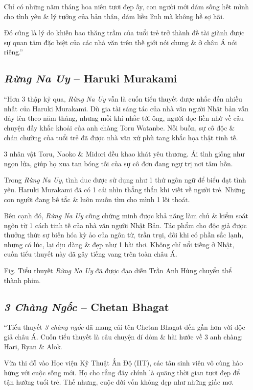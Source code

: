 \documentclass[oneside]{book}
\numberwithin{equation}{section}
\begin{document}
Chỉ có những năm tháng hoa niên tươi đẹp ấy, con người mới dám sống hết mình cho tình yêu \& lý tưởng của bản thân, dám liều lĩnh mà không hề sợ hãi.

Đó cũng là lý do khiến bao thăng trầm của tuổi trẻ trở thành đề tài giành được sự quan tâm đặc biệt của các nhà văn trên thế giới nói chung \& ở châu Á nói riêng.''

\subsection{\textit{Rừng Na Uy} -- Haruki Murakami}
``Hơn 3 thập kỷ qua, \textit{Rừng Na Uy} vẫn là cuốn tiểu thuyết được nhắc đến nhiều nhất của Haruki Murakami. Dù gia tài sáng tác của nhà văn người Nhật bản vẫn dày lên theo năm tháng, nhưng mỗi khi nhắc tới ông, người đọc liền nhớ về câu chuyện đầy khắc khoải của anh chàng Toru Watanbe. Nỗi buồn, sự cô độc \& chán chường của tuổi trẻ đã được nhà văn xứ phù tang khắc họa thật tinh tế.

3 nhân vật Toru, Naoko \& Midori đều khao khát yêu thương. Ái tình giống như ngọn lửa, giúp họ xua tan bóng tối của sự cô đơn đang ngự trị nơi tâm hồn.

Trong \textit{Rừng Na Uy}, tình duc được sử dụng như 1 thứ ngôn ngữ để biểu đạt tình yêu. Haruki Murakami đã có 1 cái nhìn thẳng thắn khi viết về người trẻ. Những con người đang bế tắc \& luôn muốn tìm cho mình 1 lối thoát.

Bên cạnh đó, \textit{Rừng Na Uy} cũng chứng minh được khả năng làm chủ \& kiểm soát ngôn từ 1 cách tinh tế của nhà văn người Nhật Bản. Tác phẩm cho độc giả được thưởng thức sự biến hóa kỳ ảo của ngôn từ, trần trụi, đôi khi có phần sắc lạnh, nhưng có lúc, lại dịu dàng \& đẹp như 1 bài thơ. Không chỉ nổi tiếng ở Nhật, cuốn tiểu thuyết này đã gây tiếng vang trên toàn châu Á.

\textsf{Fig. Tiểu thuyết \textit{Rừng Na Uy} đã được đạo diễn Trần Anh Hùng chuyển thể thành phim.}

\subsection{\textit{3 Chàng Ngốc} -- Chetan Bhagat}
``Tiểu thuyết \textit{3 chàng ngốc} đã mang cái tên Chetan Bhagat đến gần hơn với độc giả châu Á. Cuốn tiểu thuyết là câu chuyện dí dỏm \& hài hước về 3 anh chàng: Hari, Ryan \& Alok.

Vừa thi đỗ vào Học viện Kỹ Thuật Ấn Độ (IIT), các tân sinh viên vô cùng hào hứng với cuộc sống mới. Họ cho rằng đây chính là quãng thời gian tươi đẹp để tận hưởng tuổi trẻ. Thế nhưng, cuộc đời vốn không đẹp như những giấc mơ.
\end{document}
